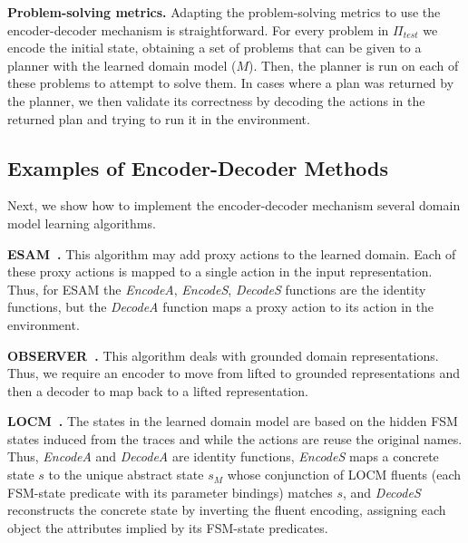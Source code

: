 \documentclass{article}
\newcommand{\miniparagraph}[1]{\textbf{#1.}}
\theoremstyle{definition}
\theoremstyle{remark}
\newcommand{\ptest}{\ensuremath{\Pi_{\textit{test}}}\xspace}
\newcommand{\encodea}{\textit{EncodeA}\xspace}
\newcommand{\encodes}{\textit{EncodeS}\xspace}
\newcommand{\decodea}{\textit{DecodeA}\xspace}
\newcommand{\decodes}{\textit{DecodeS}\xspace}
\newif\ifaddcomments
\newcommand{\roni}[1]{\ifaddcomments{\textcolor{red}{[Roni: #1]}}\fi}
\begin{document}
\roni{Would be great if someone would add an example of this.}

\miniparagraph{Problem-solving metrics} 
Adapting the problem-solving metrics to use the encoder-decoder mechanism is straightforward. 
For every problem in \ptest we encode the initial state, obtaining a set of problems that can be given to a planner with the learned domain model ($M$). 
Then, the planner is run on each of these problems to attempt to solve them.
In cases where a plan was returned by the planner, we then validate its correctness by decoding the actions in the returned plan and trying to run it in the environment. 






\subsection{Examples of Encoder-Decoder Methods}
Next, we show how to implement the encoder-decoder mechanism several domain model learning algorithms. 

\miniparagraph{ESAM~\citep{juba2021safe}}
This algorithm may add proxy actions to the learned domain. 
Each of these proxy actions is mapped to a single action in the input representation. 
Thus, for ESAM the \encodea, \encodes, \decodes functions are the identity functions, but the \decodea function maps a proxy action to its action in the environment. 

\miniparagraph{OBSERVER~\citep{wang1996learning}}
This algorithm deals with grounded domain representations. 
Thus, we require an encoder to move from lifted to grounded representations and then a decoder to map back to a lifted representation.

\miniparagraph{LOCM~\citep{cresswell2013acquiring}} 
The states in the learned domain model are based on the hidden FSM states induced from the traces and while the actions are reuse the original names. Thus, \encodea and \decodea are identity functions, \encodes maps a concrete state $s$ to the unique abstract state $s_M$ whose conjunction of LOCM fluents (each FSM-state predicate with its parameter bindings) matches $s$, and \decodes reconstructs the concrete state by inverting the fluent encoding, assigning each object the attributes implied by its FSM-state predicates.
\end{document}
